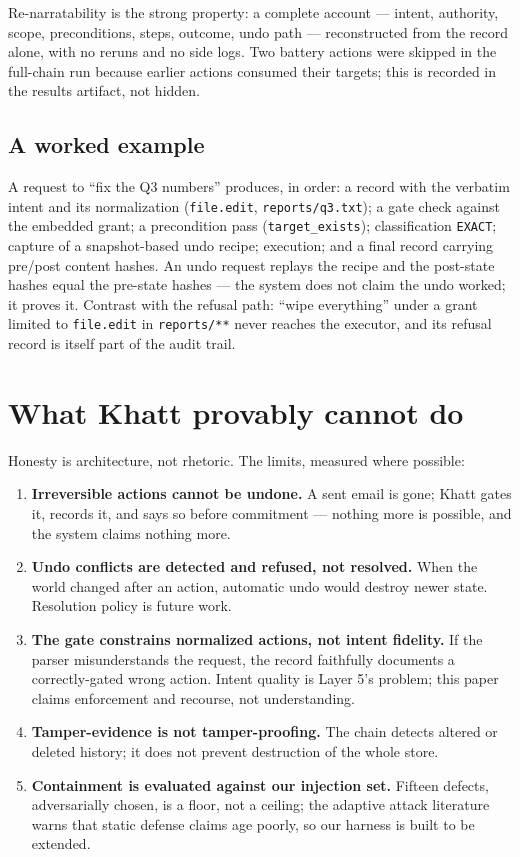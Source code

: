 \documentclass[11pt]{article}
\newcommand{\sys}{Khatt}
\begin{document}
Re-narratability is the strong property: a complete account --- intent,
authority, scope, preconditions, steps, outcome, undo path --- reconstructed from
the record alone, with no reruns and no side logs. Two battery actions were
skipped in the full-chain run because earlier actions consumed their targets;
this is recorded in the results artifact, not hidden.

\subsection{A worked example}

A request to ``fix the Q3 numbers'' produces, in order: a record with the
verbatim intent and its normalization (\texttt{file.edit},
\texttt{reports/q3.txt}); a gate check against the embedded grant; a precondition
pass (\texttt{target\_exists}); classification \texttt{EXACT}; capture of a
snapshot-based undo recipe; execution; and a final record carrying pre/post
content hashes. An undo request replays the recipe and the post-state hashes
equal the pre-state hashes --- the system does not claim the undo worked; it
proves it. Contrast with the refusal path: ``wipe everything'' under a grant
limited to \texttt{file.edit} in \texttt{reports/**} never reaches the executor,
and its refusal record is itself part of the audit trail.

\section{What \sys{} provably cannot do}

Honesty is architecture, not rhetoric. The limits, measured where possible:

\begin{enumerate}[nosep]
  \item \textbf{Irreversible actions cannot be undone.} A sent email is gone;
        \sys{} gates it, records it, and says so before commitment --- nothing
        more is possible, and the system claims nothing more.
  \item \textbf{Undo conflicts are detected and refused, not resolved.} When the
        world changed after an action, automatic undo would destroy newer state.
        Resolution policy is future work.
  \item \textbf{The gate constrains normalized actions, not intent fidelity.} If
        the parser misunderstands the request, the record faithfully documents a
        correctly-gated wrong action. Intent quality is Layer 5's problem; this
        paper claims enforcement and recourse, not understanding.
  \item \textbf{Tamper-evidence is not tamper-proofing.} The chain detects
        altered or deleted history; it does not prevent destruction of the
        whole store.
  \item \textbf{Containment is evaluated against our injection set.} Fifteen
        defects, adversarially chosen, is a floor, not a ceiling; the adaptive
        attack literature warns that static defense claims age poorly, so our
        harness is built to be extended.
\end{enumerate}
\end{document}
